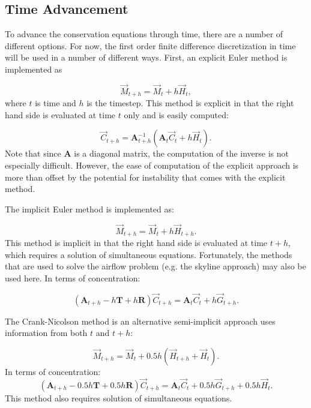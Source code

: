 \documentclass[10pt]{report}
\newcommand{\mat}[1]{\ensuremath{\mathbf{#1}}}
\begin{document}
\subsection{Time Advancement}
To advance the conservation equations through time, there are a number of
different options. For now, the first order finite difference discretization in
time will be used in a number of different ways. First, an explicit Euler method
is implemented as

\begin{equation}
\vec{M}_{t+h} = \vec{M}_t + h\vec{H}_t,
\end{equation}
\noindent
where $t$ is time and $h$ is the timestep. This method is explicit in that the right hand side
is evaluated at time $t$ only and is easily computed:

\begin{equation}
\vec{C}_{t+h} = \mat{A}_{t+h}^{-1}\left( \mat{A}_{t}\vec{C}_t + h\vec{H}_t\right).
\end{equation}
\noindent
Note that since $\mat{A}$ is a diagonal matrix, the computation of the inverse is not
especially difficult. However, the ease of computation of the explicit approach is more
than offset by the potential for instability that comes with the explicit method.

The implicit Euler method is implemented as:

\begin{equation}
\vec{M}_{t+h} = \vec{M}_t + h\vec{H}_{t+h}.
\end{equation}
\noindent
This method is implicit in that the right hand side is evaluated at time $t+h$, which
requires a solution of simultaneous equations. Fortunately, the methods that are used
to solve the airflow problem (e.g. the skyline approach) may also be used here. In terms
of concentration:

\begin{equation}
\left(\mat{A}_{t+h} -h\mat{T} +h\mat{R}\right)\vec{C}_{t+h}
 = \mat{A}_{t}\vec{C}_t + h\vec{G}_{t+h}.
\end{equation}

The Crank-Nicolson method is an alternative semi-implicit approach uses information
from both $t$ and $t+h$:

\begin{equation}
\vec{M}_{t+h} = \vec{M}_t + 0.5h(\vec{H}_{t+h} + \vec{H}_t).
\end{equation}
\noindent
In terms of concentration:
\begin{equation}
\left(\mat{A}_{t+h} - 0.5h\mat{T} + 0.5h\mat{R}\right)\vec{C}_{t+h}
 = \mat{A}_{t}\vec{C}_t + 0.5h\vec{G}_{t+h} + 0.5h\vec{H}_t.
\end{equation}
\noindent
This method also requires solution of simultaneous equations.
\end{document}
